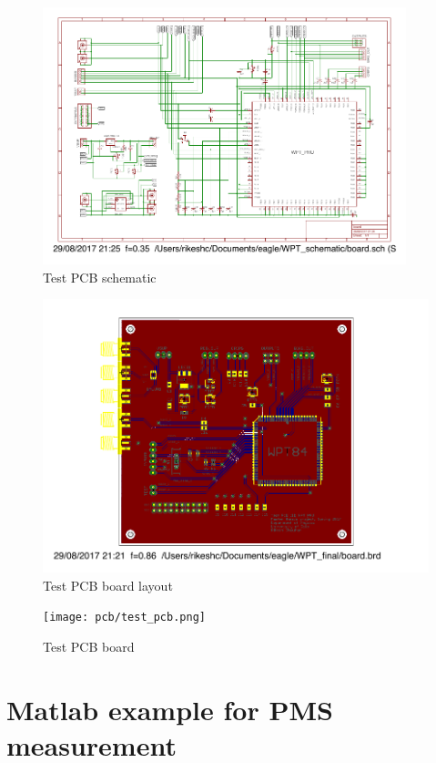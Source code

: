 \documentclass[12pt,a4paper,UKenglish]{report}
\begin{document}
\begin{appendices}
\begin{figure} [!htbp]	%
 	\centering
  	\includegraphics[width=0.94\textwidth]{appendix/pcb_schematic.pdf} 
 	\caption{Test PCB schematic} 
	\label{fig:appen_schemtic_pcb} 
\end{figure}

\begin{figure} [!htbp]
 	\centering
  	\includegraphics[width=\textwidth]{appendix/pcb_board.pdf} 
 	\caption{Test PCB board layout} 
	\label{fig:appen_board_pcb_layout} 
\end{figure}

\begin{figure} [!htbp] 	%
 	\centering
  	\texttt{[image: pcb/test\_pcb.png]} 
 	\caption{Test PCB board} 
	\label{fig:appen_board_pcb} 
\end{figure}


\chapter{Matlab example for PMS measurement}
 

\end{appendices} 
\end{document}
